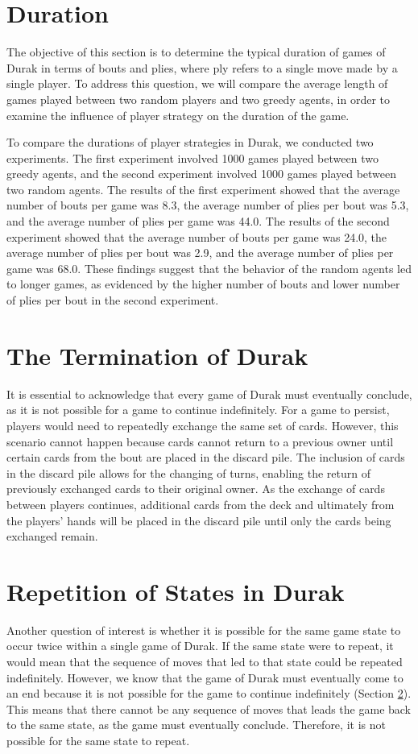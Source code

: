 \section{Duration}

The objective of this section is to determine the typical duration of games of Durak in terms of bouts and plies, where ply refers to a single move made by a single player. To address this question, we will compare the average length of games played between two random players and two greedy agents, in order to examine the influence of player strategy on the duration of the game.

To compare the durations of player strategies in Durak, we conducted two experiments. The first experiment involved 1000 games played between two greedy agents, and the second experiment involved 1000 games played between two random agents. The results of the first experiment showed that the average number of bouts per game was 8.3, the average number of plies per bout was 5.3, and the average number of plies per game was 44.0. The results of the second experiment showed that the average number of bouts per game was 24.0, the average number of plies per bout was 2.9, and the average number of plies per game was 68.0. These findings suggest that the behavior of the random agents led to longer games, as evidenced by the higher number of bouts and lower number of plies per bout in the second experiment.

\section{The Termination of Durak}
\label{termination}
It is essential to acknowledge that every game of Durak must eventually conclude, as it is not possible for a game to continue indefinitely. For a game to persist, players would need to repeatedly exchange the same set of cards. However, this scenario cannot happen because cards cannot return to a previous owner until certain cards from the bout are placed in the discard pile. The inclusion of cards in the discard pile allows for the changing of turns, enabling the return of previously exchanged cards to their original owner. As the exchange of cards between players continues, additional cards from the deck and ultimately from the players' hands will be placed in the discard pile until only the cards being exchanged remain.

\section{Repetition of States in Durak}
Another question of interest is whether it is possible for the same game state to occur twice within a single game of Durak. If the same state were to repeat, it would mean that the sequence of moves that led to that state could be repeated indefinitely. However, we know that the game of Durak must eventually come to an end because it is not possible for the game to continue indefinitely (Section \ref{termination}). This means that there cannot be any sequence of moves that leads the game back to the same state, as the game must eventually conclude. Therefore, it is not possible for the same state to repeat.

